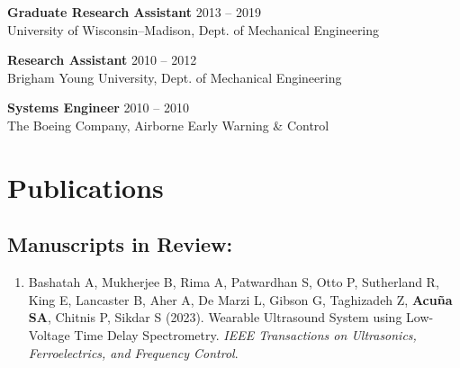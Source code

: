 \documentclass[letterpaper, 10pt]{article}
\begin{document}
\textbf{Graduate Research Assistant}
\hfill 2013 -- 2019\\ %
University of Wisconsin–Madison, Dept. of Mechanical Engineering  %
\medskip

\textbf{Research Assistant}
\hfill 2010 -- 2012\\ %
Brigham Young University, Dept. of Mechanical Engineering %
\medskip

\textbf{Systems Engineer}
\hfill 2010 -- 2010\\ %
The Boeing Company, Airborne Early Warning \& Control %

\section{Publications}

\subsection{Manuscripts in Review:}
\begin{enumerate}
    \item Bashatah A, Mukherjee B, Rima A, Patwardhan S, Otto P, Sutherland R, King E, Lancaster B, Aher A, De Marzi L, Gibson G, Taghizadeh Z, \textbf{Acuña SA}, Chitnis P, Sikdar S (2023). Wearable Ultrasound System using Low-Voltage Time Delay Spectrometry. \textit{IEEE Transactions on Ultrasonics, Ferroelectrics, and Frequency Control}.
\end{enumerate}
\end{document}

